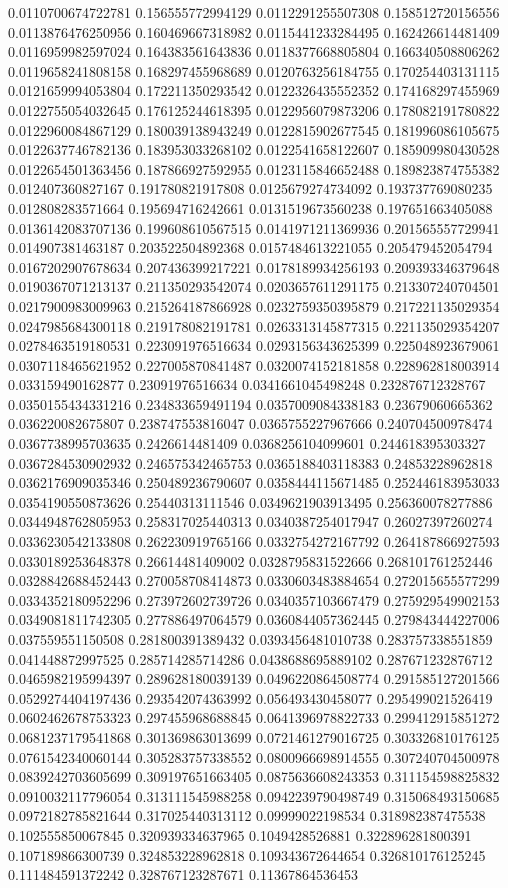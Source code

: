 \begin{table}
\begin{tabu}
\begin{sparkline}{10}
0.0110700674722781 0.156555772994129 0.0112291255507308 0.158512720156556 0.0113876476250956 0.160469667318982 0.0115441233284495 0.162426614481409 0.0116959982597024 0.164383561643836 0.0118377668805804 0.166340508806262 0.0119658241808158 0.168297455968689 0.0120763256184755 0.170254403131115 0.0121659994053804 0.172211350293542 0.0122326435552352 0.174168297455969 0.0122755054032645 0.176125244618395 0.0122956079873206 0.178082191780822 0.0122960084867129 0.180039138943249 0.0122815902677545 0.181996086105675 0.0122637746782136 0.183953033268102 0.0122541658122607 0.185909980430528 0.0122654501363456 0.187866927592955 0.0123115846652488 0.189823874755382 0.012407360827167 0.191780821917808 0.0125679274734092 0.193737769080235 0.012808283571664 0.195694716242661 0.0131519673560238 0.197651663405088 0.0136142083707136 0.199608610567515 0.0141971211369936 0.201565557729941 0.014907381463187 0.203522504892368 0.0157484613221055 0.205479452054794 0.0167202907678634 0.207436399217221 0.0178189934256193 0.209393346379648 0.0190367071213137 0.211350293542074 0.0203657611291175 0.213307240704501 0.0217900983009963 0.215264187866928 0.0232759350395879 0.217221135029354 0.0247985684300118 0.219178082191781 0.0263313145877315 0.221135029354207 0.0278463519180531 0.223091976516634 0.0293156343625399 0.225048923679061 0.0307118465621952 0.227005870841487 0.0320074152181858 0.228962818003914 0.033159490162877 0.23091976516634 0.0341661045498248 0.232876712328767 0.0350155434331216 0.234833659491194 0.0357009084338183 0.23679060665362 0.036220082675807 0.238747553816047 0.0365755227967666 0.240704500978474 0.0367738995703635 0.2426614481409 0.0368256104099601 0.244618395303327 0.0367284530902932 0.246575342465753 0.0365188403118383 0.24853228962818 0.0362176909035346 0.250489236790607 0.0358444115671485 0.252446183953033 0.0354190550873626 0.25440313111546 0.0349621903913495 0.256360078277886 0.0344948762805953 0.258317025440313 0.0340387254017947 0.26027397260274 0.0336230542133808 0.262230919765166 0.0332754272167792 0.264187866927593 0.0330189253648378 0.26614481409002 0.0328795831522666 0.268101761252446 0.0328842688452443 0.270058708414873 0.0330603483884654 0.272015655577299 0.0334352180952296 0.273972602739726 0.0340357103667479 0.275929549902153 0.0349081811742305 0.277886497064579 0.0360844057362445 0.279843444227006 0.037559551150508 0.281800391389432 0.0393456481010738 0.283757338551859 0.041448872997525 0.285714285714286 0.0438688695889102 0.287671232876712 0.0465982195994397 0.289628180039139 0.0496220864508774 0.291585127201566 0.0529274404197436 0.293542074363992 0.056493430458077 0.295499021526419 0.0602462678753323 0.297455968688845 0.0641396978822733 0.299412915851272 0.0681237179541868 0.301369863013699 0.0721461279016725 0.303326810176125 0.0761542340060144 0.305283757338552 0.0800966698914555 0.307240704500978 0.0839242703605699 0.309197651663405 0.0875636608243353 0.311154598825832 0.0910032117796054 0.313111545988258 0.0942239790498749 0.315068493150685 0.0972182785821644 0.317025440313112 0.09999022198534 0.318982387475538 0.102555850067845 0.320939334637965 0.1049428526881 0.322896281800391 0.107189866300739 0.324853228962818 0.109343672644654 0.326810176125245 0.111484591372242 0.328767123287671 0.11367864536453 
\end{sparkline}
\end{tabu}
\end{table}
